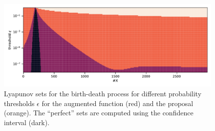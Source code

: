 \begin{figure}[htb]
\centering
\includegraphics[width=\textwidth]{gfx/lya_sets.pdf}
	\caption[Augmented v.\ proposal Lyapunov sets]{\label{fig:lya_sets}Lyapunov sets for the birth-death process for different probability thresholds $\epsilon$ for the augmented function (red) and the proposal (orange). The ``perfect'' sets are computed using the confidence interval (dark).}
\end{figure}
\begin{figure}[htb]
	\centering
	\caption{\label{fig:improvement}}
\end{figure}

